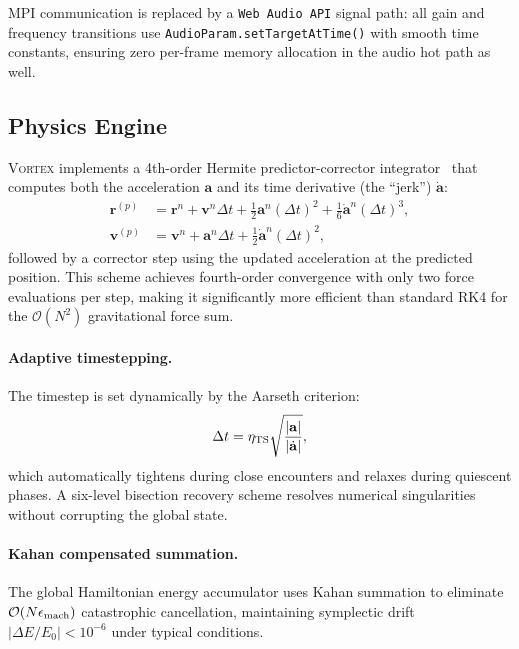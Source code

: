 \documentclass[aps,prd,twocolumn,superscriptaddress,nofootinbib,showpacs,
               longbibliography]{revtex4-2}
\newcommand{\code}[1]{\texttt{#1}}
\newcommand{\order}[1]{\mathcal{O}(#1)}
\begin{document}
MPI communication is replaced by a \code{Web Audio API} signal path:
all gain and frequency transitions use \code{AudioParam.setTargetAtTime()}
with smooth time constants, ensuring zero per-frame memory allocation in
the audio hot path as well.

\subsection{Physics Engine}
\label{sec:vortex_physics}

\textsc{Vortex} implements a 4th-order Hermite predictor-corrector
integrator~\cite{MakinoAarseth1992} that computes both the acceleration
$\mathbf{a}$ and its time derivative (the ``jerk'') $\dot{\mathbf{a}}$:
\begin{align}
  \mathbf{r}^{(p)} &= \mathbf{r}^n + \mathbf{v}^n\Delta t
    + \tfrac{1}{2}\mathbf{a}^n(\Delta t)^2
    + \tfrac{1}{6}\dot{\mathbf{a}}^n(\Delta t)^3, \\
  \mathbf{v}^{(p)} &= \mathbf{v}^n + \mathbf{a}^n\Delta t
    + \tfrac{1}{2}\dot{\mathbf{a}}^n(\Delta t)^2,
\end{align}
followed by a corrector step using the updated acceleration at the
predicted position.
This scheme achieves fourth-order convergence with only two force
evaluations per step, making it significantly more efficient than
standard RK4 for the $\order{N^2}$ gravitational force sum.

\paragraph{Adaptive timestepping.}
The timestep is set dynamically by the Aarseth criterion:
\begin{equation}
  \Delta t = \eta_{\rm TS}\sqrt{\frac{|\mathbf{a}|}{|\dot{\mathbf{a}}|}},
\end{equation}
which automatically tightens during close encounters and relaxes during
quiescent phases.
A six-level bisection recovery scheme resolves numerical singularities
without corrupting the global state.

\paragraph{Kahan compensated summation.}
The global Hamiltonian energy accumulator uses Kahan summation
to eliminate $\order{N\epsilon_{\rm mach}}$ catastrophic cancellation,
maintaining symplectic drift $|\Delta E/E_0| < 10^{-6}$ under typical
conditions.
\end{document}
